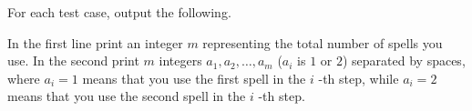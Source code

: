 For each test case, output the following.

In the first line print an integer $m$ representing the total number of spells you use.
In the second print $m$ integers $a_1,a_2,\ldots,a_m$
 ($a_i$ is $1$ or $2$) separated by spaces, where $a_i=1$
 means that you use the first spell in the $i$
-th step, while $a_i=2$
 means that you use the second spell in the $i$
-th step.
